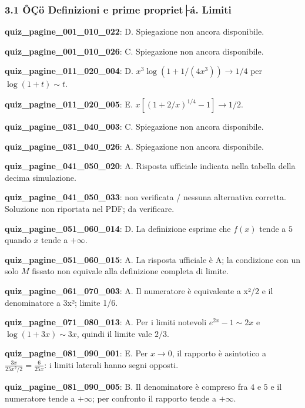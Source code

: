 \documentclass[11pt,a4paper]{article}
\newcounter{quiz}
\begin{document}
\subsubsection*{3.1 ÔÇö Definizioni e prime propriet├á. Limiti}
\noindent\textbf{quiz\_pagine\_001\_010\_022}: D. Spiegazione non ancora disponibile.\par\medskip
\noindent\textbf{quiz\_pagine\_001\_010\_026}: C. Spiegazione non ancora disponibile.\par\medskip
\noindent\textbf{quiz\_pagine\_011\_020\_004}: D. $x^3\log(1+1/(4x^3))\to1/4$ per $\log(1+t)\sim t$.\par\medskip
\noindent\textbf{quiz\_pagine\_011\_020\_005}: E. $x[(1+2/x)^{1/4}-1]\to 1/2$.\par\medskip
\noindent\textbf{quiz\_pagine\_031\_040\_003}: C. Spiegazione non ancora disponibile.\par\medskip
\noindent\textbf{quiz\_pagine\_031\_040\_026}: A. Spiegazione non ancora disponibile.\par\medskip
\noindent\textbf{quiz\_pagine\_041\_050\_020}: A. Risposta ufficiale indicata nella tabella della decima simulazione.\par\medskip
\noindent\textbf{quiz\_pagine\_041\_050\_033}: non verificata / nessuna alternativa corretta. Soluzione non riportata nel PDF; da verificare.\par\medskip
\noindent\textbf{quiz\_pagine\_051\_060\_014}: D. La definizione esprime che $f(x)$ tende a $5$ quando $x$ tende a $+\infty$.\par\medskip
\noindent\textbf{quiz\_pagine\_051\_060\_015}: A. La risposta ufficiale è A; la condizione con un solo $M$ fissato non equivale alla definizione completa di limite.\par\medskip
\noindent\textbf{quiz\_pagine\_061\_070\_003}: A. Il numeratore è equivalente a x²/2 e il denominatore a 3x²; limite 1/6.\par\medskip
\noindent\textbf{quiz\_pagine\_071\_080\_013}: A. Per i limiti notevoli $e^{2x}-1\sim2x$ e $\log(1+3x)\sim3x$, quindi il limite vale $2/3$.\par\medskip
\noindent\textbf{quiz\_pagine\_081\_090\_001}: E. Per $x\to0$, il rapporto è asintotico a $\frac{3x}{25x^2/2}=\frac{6}{25x}$: i limiti laterali hanno segni opposti.\par\medskip
\noindent\textbf{quiz\_pagine\_081\_090\_005}: B. Il denominatore è compreso fra $4$ e $5$ e il numeratore tende a $+\infty$; per confronto il rapporto tende a $+\infty$.\par\medskip
\end{document}
